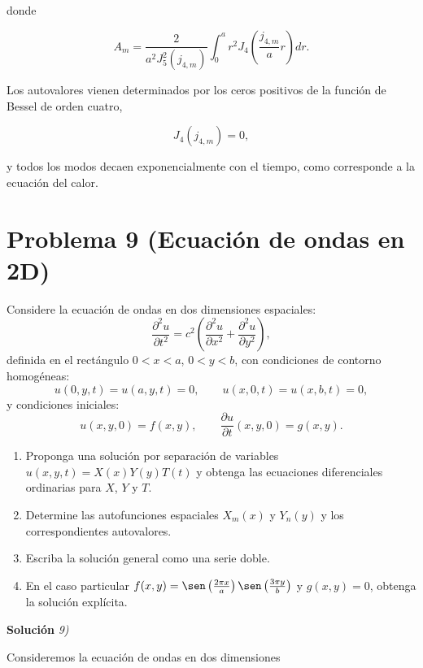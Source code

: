 \documentclass[12pt]{article}
\begin{document}
donde

\begin{equation}
A_m=
\frac{2}
{a^2J_5^2(j_{4,m})}
\int_0^a
r^2
J_4
\!\left(
\frac{j_{4,m}}{a}r
\right)
dr.
\end{equation}

Los autovalores vienen determinados por los ceros positivos de la función de Bessel de orden cuatro,

\[
J_4(j_{4,m})=0,
\]

y todos los modos decaen exponencialmente con el tiempo, como corresponde a la ecuación del calor.











\section*{Problema 9 (Ecuación de ondas en 2D)}
Considere la ecuación de ondas en dos dimensiones espaciales:
\[
\frac{\partial^2 u}{\partial t^2} = c^2 \left( \frac{\partial^2 u}{\partial x^2} + \frac{\partial^2 u}{\partial y^2} \right),
\]
definida en el rectángulo \(0 < x < a\), \(0 < y < b\), con condiciones de contorno homogéneas:
\[
u(0, y, t) = u(a, y, t) = 0, \qquad u(x, 0, t) = u(x, b, t) = 0,
\]
y condiciones iniciales:
\[
u(x, y, 0) = f(x, y), \qquad \frac{\partial u}{\partial t}(x, y, 0) = g(x, y).
\]
\begin{enumerate}
    \item[(a)] Proponga una solución por separación de variables \(u(x,y,t) = X(x)Y(y)T(t)\) y obtenga las ecuaciones diferenciales ordinarias para \(X\), \(Y\) y \(T\).
    \item[(b)] Determine las autofunciones espaciales \(X_m(x)\) y \(Y_n(y)\) y los correspondientes autovalores.
    \item[(c)] Escriba la solución general como una serie doble.
    \item[(d)] En el caso particular \(f(x,y) = \sen\left(\frac{2\pi x}{a}\right) \sen\left(\frac{3\pi y}{b}\right)\) y \(g(x,y) = 0\), obtenga la solución explícita.
\end{enumerate}

\vspace{0.5cm}
{\bf Soluci\'on }{\em 9)}
\vspace{0.5cm}

Consideremos la ecuación de ondas en dos dimensiones
\end{document}
